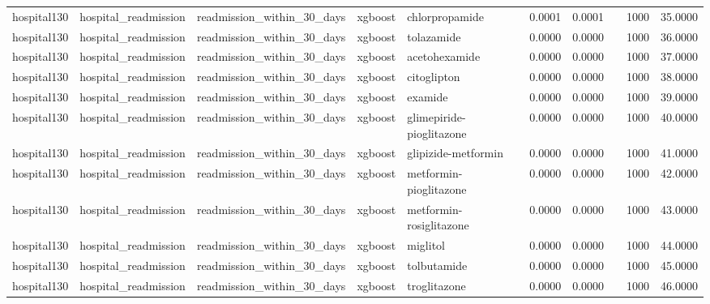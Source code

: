 \begin{tabular}{llllllllll}
hospital130 & hospital\_readmission & readmission\_within\_30\_days & xgboost & chlorpropamide & 0.0001 & 0.0001 &  & 1000 & 35.0000 \\
hospital130 & hospital\_readmission & readmission\_within\_30\_days & xgboost & tolazamide & 0.0000 & 0.0000 &  & 1000 & 36.0000 \\
hospital130 & hospital\_readmission & readmission\_within\_30\_days & xgboost & acetohexamide & 0.0000 & 0.0000 &  & 1000 & 37.0000 \\
hospital130 & hospital\_readmission & readmission\_within\_30\_days & xgboost & citoglipton & 0.0000 & 0.0000 &  & 1000 & 38.0000 \\
hospital130 & hospital\_readmission & readmission\_within\_30\_days & xgboost & examide & 0.0000 & 0.0000 &  & 1000 & 39.0000 \\
hospital130 & hospital\_readmission & readmission\_within\_30\_days & xgboost & glimepiride-pioglitazone & 0.0000 & 0.0000 &  & 1000 & 40.0000 \\
hospital130 & hospital\_readmission & readmission\_within\_30\_days & xgboost & glipizide-metformin & 0.0000 & 0.0000 &  & 1000 & 41.0000 \\
hospital130 & hospital\_readmission & readmission\_within\_30\_days & xgboost & metformin-pioglitazone & 0.0000 & 0.0000 &  & 1000 & 42.0000 \\
hospital130 & hospital\_readmission & readmission\_within\_30\_days & xgboost & metformin-rosiglitazone & 0.0000 & 0.0000 &  & 1000 & 43.0000 \\
hospital130 & hospital\_readmission & readmission\_within\_30\_days & xgboost & miglitol & 0.0000 & 0.0000 &  & 1000 & 44.0000 \\
hospital130 & hospital\_readmission & readmission\_within\_30\_days & xgboost & tolbutamide & 0.0000 & 0.0000 &  & 1000 & 45.0000 \\
hospital130 & hospital\_readmission & readmission\_within\_30\_days & xgboost & troglitazone & 0.0000 & 0.0000 &  & 1000 & 46.0000 \\
\hline
\end{tabular}
